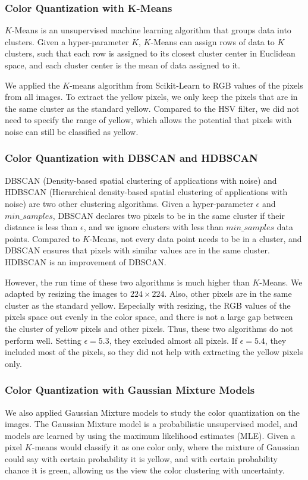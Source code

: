 \documentclass{m2pi}
\begin{document}
\subsubsection{Color Quantization with K-Means}

$K$-Means is an unsupervised machine learning algorithm that groups data into clusters. Given a hyper-parameter $K$, $K$-Means can assign rows of data to $K$ clusters, such that each row is assigned to its closest cluster center in Euclidean space, and each cluster center is the mean of data assigned to it.

We applied the $K$-means algorithm from Scikit-Learn to RGB values of the pixels from all images. To extract the yellow pixels, we only keep the pixels that are in the same cluster as the standard yellow. Compared to the HSV filter, we did not need to specify the range of yellow, which allows the potential that pixels with noise can still be classified as yellow.


\subsubsection{Color Quantization with DBSCAN and HDBSCAN}

DBSCAN (Density-based spatial clustering of applications with noise) and HDBSCAN (Hierarchical density-based spatial clustering of applications with noise) are two other clustering algorithms. Given a hyper-parameter $\epsilon$ and $min\_samples$, DBSCAN declares two pixels to be in the same cluster if their distance is less than $\epsilon$, and we ignore clusters with less than $min\_samples$ data points. Compared to $K$-Means, not every data point needs to be in a cluster, and DBSCAN ensures that pixels with similar values are in the same cluster. HDBSCAN is an improvement of DBSCAN.

However, the run time of these two algorithms is much higher than $K$-Means. We adapted by resizing the images to $224 \times 224$. Also, other pixels are in the same cluster as the standard yellow. Especially with resizing, the RGB values of the pixels space out evenly in the color space, and there is not a large gap between the cluster of yellow pixels and other pixels. Thus, these two algorithms do not perform well. Setting $\epsilon=5.3$, they excluded almost all pixels. If $\epsilon=5.4$, they included most of the pixels, so they did not help with extracting the yellow pixels only.

\subsubsection{Color Quantization with Gaussian Mixture Models}
We also applied Gaussian Mixture models to study the color quantization on the images. The Gaussian Mixture model is a probabilistic unsupervised model, and models are learned by using the maximum likelihood estimates (MLE).  Given a pixel $K$-means would classify it as one color only, where the mixture of Gaussian could say with certain probability it is yellow, and with certain probability chance it is green, allowing us the view the color clustering with uncertainty.
\end{document}
